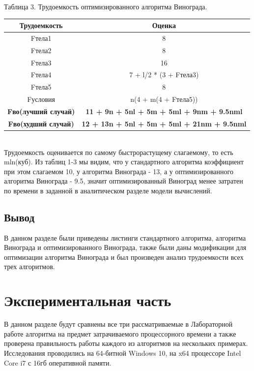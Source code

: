\documentclass[a4paper, 14pt]{article}
\begin{document}
        	\begin{center}
  	Таблица 3. Трудоемкость оптимизированного алгоритма Винограда.\\
	\end{center}        \begin{tabular}{ | c | c | }
        \hline
		Трудоемкость & Оценка\\ \hline
		Fтела1 & 8\\ \hline
		Fтела2 & 8\\ \hline
		Fтела3 & 16\\ \hline
		Fтела4 & 7 + l/2 * (3 + Fтела3)\\ \hline
		Fтела5 & 8\\ \hline
		Fусловия &  n(4 + m(4 + Fтела5)) \\ \hline
		\textbf{Fво(лучший случай)} & \textbf{11 + 9n + 5nl + 5m + 5ml + 9nm + 9.5nml}\\ \hline
		\textbf{Fво(худший случай)} & \textbf{12 + 13n + 5nl + 5m + 5ml + 21nm + 9.5nml}\\ \hline
		\hline
        \end{tabular}\\
	Трудоемкость оценивается по самому быстрорастущему слагаемому, то есть mln(куб). Из таблиц 1-3 мы видим, что у стандартного алгоритма коэффициент при этом слагаемом 10, у алгоритма Винограда - 13, а у оптимизированного алгоритма Винограда - 9.5, значит оптимизированный Виноград менее затратен по времени в заданной в аналитическом разделе модели вычислений.
   \subsection{Вывод} 
   В данном разделе были приведены листинги стандартного алгоритма, алгоритма Винограда и оптимизированного Винограда, также были даны модификации для оптимизации алгоритма Винограда и был произведен анализ трудоемкости всех трех алгоритмов.
	 
    
       	\newpage
       	
        \section{Экспериментальная часть}
        В данном разделе будут сравнены все три рассматриваемые в Лабораторной работе алгоритма на предмет затрачиваемого процессорного времени а также проверена правильность работы каждого из алгоритмов на нескольких примерах. Исследования проводились на 64-битной Windows 10, на x64 процессоре Intel Core i7 с 16гб оперативной памяти.
\end{document}
